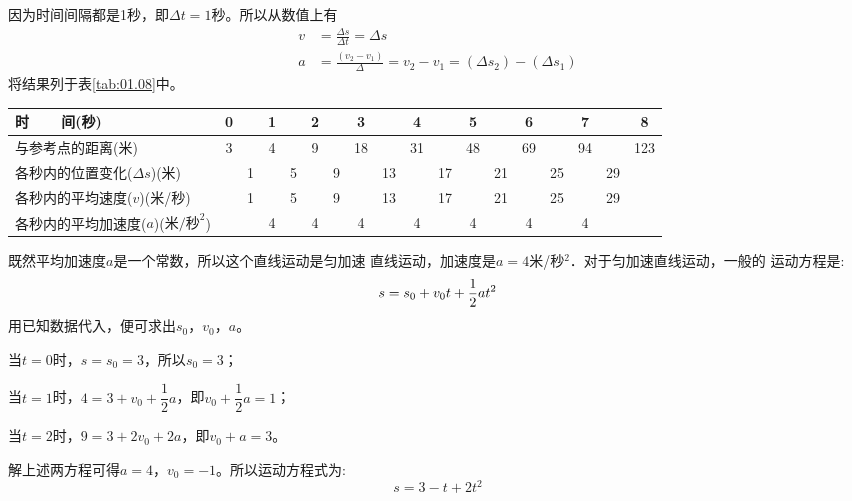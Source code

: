 \solution 因为时间间隔都是1秒，即$\Delta t=1$秒。所以从数值上有
\begin{align*}
    v & =\frac{\Delta s}{\Delta t}=\Delta s                         \\
    a & =\frac{(v_2-v_1)}{\Delta}=v_2-v_1=(\Delta s_2)-(\Delta s_1)
\end{align*}
将结果列于表\ref{tab:01.08}中。
\begin{tablex}[!h]{0.2mm}
        \caption{}
        \label{tab:01.08}
        \centering {}
        \begin{tabular}{l|c|c|c|c|c|c|c|c|c|c|c|c|c|c|c|c|c}
            \toprule
            时~~~~间(秒)                              & 0 &   & 1 &   & 2 &   & 3  &    & 4  &    & 5  &    & 6  &    & 7  &    & 8   \\
            \midrule
            与参考点的距离(米)                        & 3 &   & 4 &   & 9 &   & 18 &    & 31 &    & 48 &    & 69 &    & 94 &    & 123 \\
            各秒内的位置变化($\Delta s$)(米)          &   & 1 &   & 5 &   & 9 &    & 13 &    & 17 &    & 21 &    & 25 &    & 29 &     \\
            各秒内的平均速度($v$)(米/秒)              &   & 1 &   & 5 &   & 9 &    & 13 &    & 17 &    & 21 &    & 25 &    & 29 &     \\
            各秒内的平均加速度($a$)($\text{米/秒}^2$) &   &   & 4 &   & 4 &   & 4  &    & 4  &    & 4  &    & 4  &    & 4  &    &     \\
            \bottomrule
        \end{tabular}
\end{tablex}
\clearpage
既然平均加速度$a$是一个常数，所以这个直线运动是匀加速
直线运动，加速度是$a=4$米/秒$^2$．对于匀加速直线运动，一般的
运动方程是:
\begin{equation*}
    s=s_0+v_{0}t+\frac{1}{2}at^2 \vspace{-0.5em}
\end{equation*}
用已知数据代入，便可求出$s_0$，$v_0$，$a$。

当$t=0$时，$s=s_0=3$，所以$s_0=3$；

当$t=1$时，$4=3+v_0+\dfrac 1 2 a$，即$v_0+\dfrac 1 2 a=1$；

当$t=2$时，$9=3+2v_0+2a$，即$v_0+a=3$。

解上述两方程可得$a=4$，$v_0=-1$。所以运动方程式为:
\begin{equation*}
    s=3-t+2t^2
\end{equation*}

